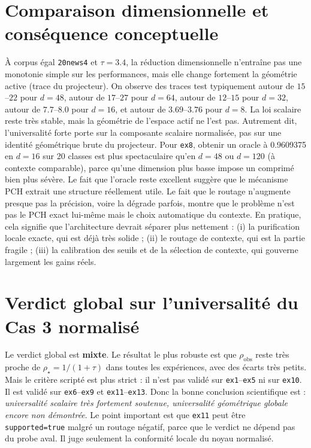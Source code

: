 \documentclass[11pt,a4paper]{article}
\newcommand{\code}[1]{\texttt{#1}}
\begin{document}
\section*{Comparaison dimensionnelle et conséquence conceptuelle}
À corpus égal \code{20news4} et $\tau=3.4$, la réduction dimensionnelle n'entraîne pas une monotonie simple sur les performances, mais elle change fortement la géométrie active (trace du projecteur). On observe des traces test typiquement autour de $15$--$22$ pour $d=48$, autour de $17$--$27$ pour $d=64$, autour de $12$--$15$ pour $d=32$, autour de $7.7$--$8.0$ pour $d=16$, et autour de $3.69$--$3.76$ pour $d=8$. La loi scalaire reste très stable, mais la géométrie de l'espace actif ne l'est pas. Autrement dit, l'universalité forte porte sur la composante scalaire normalisée, pas sur une identité géométrique brute du projecteur.
Pour \code{ex8}, obtenir un oracle à 0.9609375 en $d=16$ sur 20 classes est plus spectaculaire qu'en $d=48$ ou $d=120$ (à contexte comparable), parce qu'une dimension plus basse impose un comprimé bien plus sévère. Le fait que l'oracle reste excellent suggère que le mécanisme PCH extrait une structure réellement utile. Le fait que le routage n'augmente presque pas la précision, voire la dégrade parfois, montre que le problème n'est pas le PCH exact lui-même mais le choix automatique du contexte.
En pratique, cela signifie que l'architecture devrait séparer plus nettement : (i) la purification locale exacte, qui est déjà très solide ; (ii) le routage de contexte, qui est la partie fragile ; (iii) la calibration des seuils et de la sélection de contexte, qui gouverne largement les gains réels.
\section*{Verdict global sur l'universalité du Cas 3 normalisé}
Le verdict global est \textbf{mixte}. Le résultat le plus robuste est que \(\rho_{\mathrm{obs}}\) reste très proche de \(\rho_\star = 1/(1+\tau)\) dans toutes les expériences, avec des écarts très petits. Mais le critère scripté est plus strict : il n'est pas validé sur \code{ex1}--\code{ex5} ni sur \code{ex10}. Il est validé sur \code{ex6}--\code{ex9} et \code{ex11}--\code{ex13}. Donc la bonne conclusion scientifique est : \emph{universalité scalaire très fortement soutenue, universalité géométrique globale encore non démontrée}.
Le point important est que \code{ex11} peut être \code{supported=true} malgré un routage négatif, parce que le verdict ne dépend pas du probe aval. Il juge seulement la conformité locale du noyau normalisé.
\end{document}
